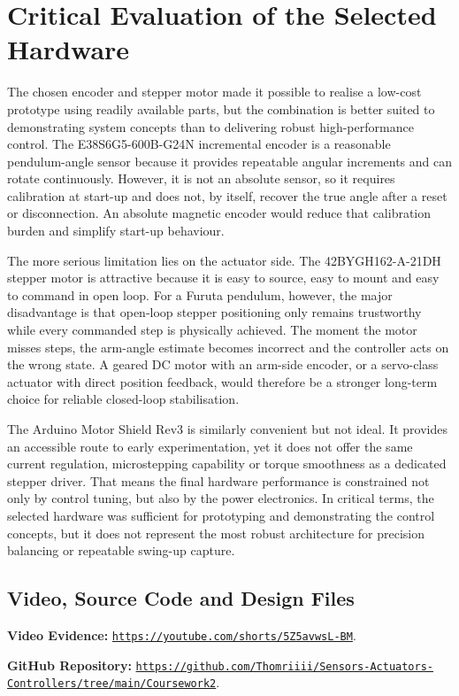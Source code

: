 \documentclass[conference]{IEEEtran}
\begin{document}
\section{Critical Evaluation of the Selected Hardware}
The chosen encoder and stepper motor made it possible to realise a low-cost prototype using readily available parts, but the combination is better suited to demonstrating system concepts than to delivering robust high-performance control. The E38S6G5-600B-G24N incremental encoder is a reasonable pendulum-angle sensor because it provides repeatable angular increments and can rotate continuously. However, it is not an absolute sensor, so it requires calibration at start-up and does not, by itself, recover the true angle after a reset or disconnection. An absolute magnetic encoder would reduce that calibration burden and simplify start-up behaviour.

The more serious limitation lies on the actuator side. The 42BYGH162-A-21DH stepper motor is attractive because it is easy to source, easy to mount and easy to command in open loop. For a Furuta pendulum, however, the major disadvantage is that open-loop stepper positioning only remains trustworthy while every commanded step is physically achieved. The moment the motor misses steps, the arm-angle estimate becomes incorrect and the controller acts on the wrong state. A geared DC motor with an arm-side encoder, or a servo-class actuator with direct position feedback, would therefore be a stronger long-term choice for reliable closed-loop stabilisation.

The Arduino Motor Shield Rev3 is similarly convenient but not ideal. It provides an accessible route to early experimentation, yet it does not offer the same current regulation, microstepping capability or torque smoothness as a dedicated stepper driver. That means the final hardware performance is constrained not only by control tuning, but also by the power electronics. In critical terms, the selected hardware was sufficient for prototyping and demonstrating the control concepts, but it does not represent the most robust architecture for precision balancing or repeatable swing-up capture.

\subsection{Video, Source Code and Design Files}
\noindent\textbf{Video Evidence:} \href{https://youtube.com/shorts/5Z5avwsL-BM}{\nolinkurl{https://youtube.com/shorts/5Z5avwsL-BM}}. \par
\noindent\textbf{GitHub Repository:} \href{https://github.com/Thomriiii/Sensors-Actuators-Controllers/tree/main/Coursework2}{\nolinkurl{https://github.com/Thomriiii/Sensors-Actuators-Controllers/tree/main/Coursework2}}. \par
\end{document}
